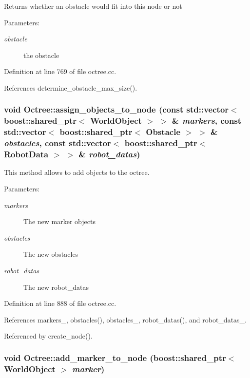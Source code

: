 Returns whether an obstacle would fit into this node or not

\begin{Desc}
\item[Parameters:]
\begin{description}
\item[{\em obstacle}]the obstacle \end{description}
\end{Desc}


Definition at line 769 of file octree.cc.

References determine\_\-obstacle\_\-max\_\-size().\hypertarget{class_octree_7c327c632fbbcac0676ccd8dda9d99ce}{
\subsubsection[assign\_\-objects\_\-to\_\-node]{\setlength{\rightskip}{0pt plus 5cm}void Octree::assign\_\-objects\_\-to\_\-node (const std::vector$<$ boost::shared\_\-ptr$<$ {\bf WorldObject} $>$ $>$ \& {\em markers}, \/  const std::vector$<$ boost::shared\_\-ptr$<$ Obstacle $>$ $>$ \& {\em obstacles}, \/  const std::vector$<$ boost::shared\_\-ptr$<$ {\bf RobotData} $>$ $>$ \& {\em robot\_\-datas})}}
\label{class_octree_7c327c632fbbcac0676ccd8dda9d99ce}


This method allows to add objects to the octree.

\begin{Desc}
\item[Parameters:]
\begin{description}
\item[{\em markers}]The new marker objects \item[{\em obstacles}]The new obstacles \item[{\em robot\_\-datas}]The new robot\_\-datas \end{description}
\end{Desc}


Definition at line 888 of file octree.cc.

References markers\_\-, obstacles(), obstacles\_\-, robot\_\-datas(), and robot\_\-datas\_\-.

Referenced by create\_\-node().\hypertarget{class_octree_1e97431b76893f009beca8578f365ca9}{
\subsubsection[add\_\-marker\_\-to\_\-node]{\setlength{\rightskip}{0pt plus 5cm}void Octree::add\_\-marker\_\-to\_\-node (boost::shared\_\-ptr$<$ {\bf WorldObject} $>$ {\em marker})}}
\label{class_octree_1e97431b76893f009beca8578f365ca9}


